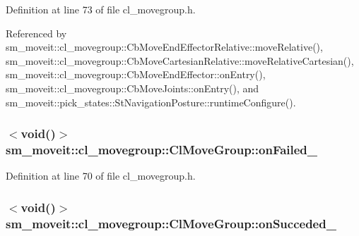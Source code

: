 Definition at line 73 of file cl\+\_\+movegroup.\+h.



Referenced by sm\+\_\+moveit\+::cl\+\_\+movegroup\+::\+Cb\+Move\+End\+Effector\+Relative\+::move\+Relative(), sm\+\_\+moveit\+::cl\+\_\+movegroup\+::\+Cb\+Move\+Cartesian\+Relative\+::move\+Relative\+Cartesian(), sm\+\_\+moveit\+::cl\+\_\+movegroup\+::\+Cb\+Move\+End\+Effector\+::on\+Entry(), sm\+\_\+moveit\+::cl\+\_\+movegroup\+::\+Cb\+Move\+Joints\+::on\+Entry(), and sm\+\_\+moveit\+::pick\+\_\+states\+::\+St\+Navigation\+Posture\+::runtime\+Configure().

\subsubsection[{\texorpdfstring{on\+Failed\+\_\+}{onFailed_}}]{$<$void()$>$ sm\+\_\+moveit\+::cl\+\_\+movegroup\+::\+Cl\+Move\+Group\+::on\+Failed\+\_\+\hspace{0.3cm}{\ttfamily [private]}}\hypertarget{classsm__moveit_1_1cl__movegroup_1_1ClMoveGroup_ab4d03a5e64608a13458d740ce1536c8e}{}\label{classsm__moveit_1_1cl__movegroup_1_1ClMoveGroup_ab4d03a5e64608a13458d740ce1536c8e}


Definition at line 70 of file cl\+\_\+movegroup.\+h.

\subsubsection[{\texorpdfstring{on\+Succeded\+\_\+}{onSucceded_}}]{$<$void()$>$ sm\+\_\+moveit\+::cl\+\_\+movegroup\+::\+Cl\+Move\+Group\+::on\+Succeded\+\_\+\hspace{0.3cm}{\ttfamily [private]}}\hypertarget{classsm__moveit_1_1cl__movegroup_1_1ClMoveGroup_ad0a02fb564967bae0808c966dd1e3c36}{}\label{classsm__moveit_1_1cl__movegroup_1_1ClMoveGroup_ad0a02fb564967bae0808c966dd1e3c36}


